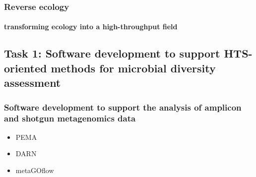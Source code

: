\documentclass{beamer}
\begin{document}
   \begin{frame}

      \frametitle{Reverse ecology}
      \framesubtitle{transforming ecology into a high-throughput field}

      \begin{singlespace}
      \end{singlespace}

   \end{frame}

   \begin{darkframes}
      \section{
      Task 1: Software development to support HTS-oriented methods for microbial diversity assessment
      }
      \begin{frame}
         \frametitle{Software development to support the analysis of amplicon and shotgun metagenomics data}
         \begin{itemize}
            \item PEMA
            \item DARN
            \item metaGOflow
         \end{itemize}
      \end{frame}
   \end{darkframes}
\end{document}
